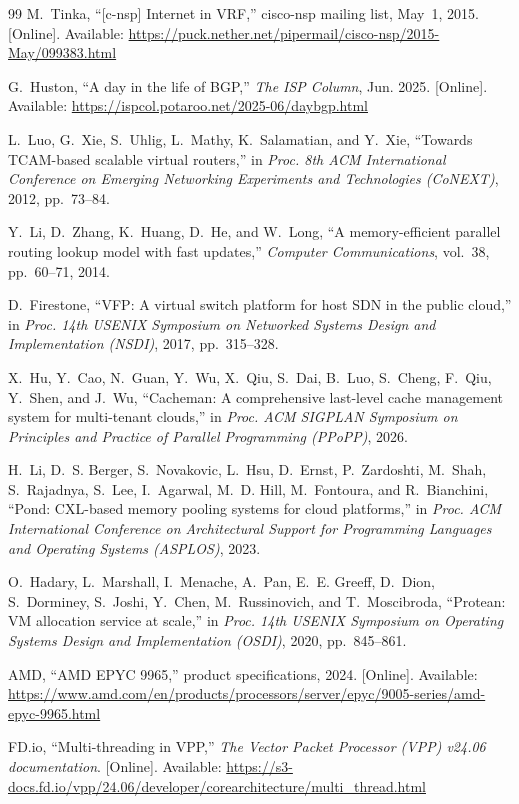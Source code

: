 \documentclass[11pt,a4paper,oneside]{report}
\begin{document}
\begin{thebibliography}{99}
M.~Tinka, ``[c-nsp] Internet in VRF,'' cisco-nsp mailing list, May~1, 2015.
[Online]. Available:
\url{https://puck.nether.net/pipermail/cisco-nsp/2015-May/099383.html}

G.~Huston, ``A day in the life of BGP,'' \emph{The ISP Column}, Jun. 2025.
[Online]. Available: \url{https://ispcol.potaroo.net/2025-06/daybgp.html}

L.~Luo, G.~Xie, S.~Uhlig, L.~Mathy, K.~Salamatian, and Y.~Xie, ``Towards
TCAM-based scalable virtual routers,'' in \emph{Proc. 8th ACM International
Conference on Emerging Networking Experiments and Technologies (CoNEXT)}, 2012,
pp.~73--84.

Y.~Li, D.~Zhang, K.~Huang, D.~He, and W.~Long, ``A memory-efficient parallel
routing lookup model with fast updates,'' \emph{Computer Communications},
vol.~38, pp.~60--71, 2014.

D.~Firestone, ``VFP: A virtual switch platform for host SDN in the public
cloud,'' in \emph{Proc. 14th USENIX Symposium on Networked Systems Design and
Implementation (NSDI)}, 2017, pp.~315--328.

X.~Hu, Y.~Cao, N.~Guan, Y.~Wu, X.~Qiu, S.~Dai, B.~Luo, S.~Cheng, F.~Qiu,
Y.~Shen, and J.~Wu, ``Cacheman: A comprehensive last-level cache management
system for multi-tenant clouds,'' in \emph{Proc. ACM SIGPLAN Symposium on
Principles and Practice of Parallel Programming (PPoPP)}, 2026.

H.~Li, D.~S. Berger, S.~Novakovic, L.~Hsu, D.~Ernst, P.~Zardoshti, M.~Shah,
S.~Rajadnya, S.~Lee, I.~Agarwal, M.~D. Hill, M.~Fontoura, and R.~Bianchini,
``Pond: CXL-based memory pooling systems for cloud platforms,'' in \emph{Proc.
ACM International Conference on Architectural Support for Programming Languages
and Operating Systems (ASPLOS)}, 2023.

O.~Hadary, L.~Marshall, I.~Menache, A.~Pan, E.~E. Greeff, D.~Dion,
S.~Dorminey, S.~Joshi, Y.~Chen, M.~Russinovich, and T.~Moscibroda, ``Protean:
VM allocation service at scale,'' in \emph{Proc. 14th USENIX Symposium on
Operating Systems Design and Implementation (OSDI)}, 2020, pp.~845--861.

AMD, ``AMD EPYC 9965,'' product specifications, 2024. [Online]. Available:
\url{https://www.amd.com/en/products/processors/server/epyc/9005-series/amd-epyc-9965.html}

FD.io, ``Multi-threading in VPP,'' \emph{The Vector Packet Processor (VPP)
v24.06 documentation}. [Online]. Available:
\url{https://s3-docs.fd.io/vpp/24.06/developer/corearchitecture/multi_thread.html}


\end{thebibliography}
\end{document}
